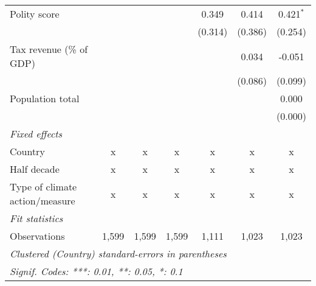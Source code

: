 \begin{tabular}{lcccccc}
   Polity score                                              &               &                &                & 0.349          & 0.414          & 0.421$^{*}$\\   
                                                             &               &                &                & (0.314)        & (0.386)        & (0.254)\\   
   Tax revenue (\% of GDP)                                   &               &                &                &                & 0.034          & -0.051\\   
                                                             &               &                &                &                & (0.086)        & (0.099)\\   
   Population total                                          &               &                &                &                &                & 0.000\\   
                                                             &               &                &                &                &                & (0.000)\\   
   \emph{Fixed effects}\\
   Country                                                   & x             & x              & x              & x              & x              & x\\  
   Half decade                                               & x             & x              & x              & x              & x              & x\\  
   Type of climate action/measure                            & x             & x              & x              & x              & x              & x\\  
   \midrule \emph{Fit statistics}\\
   Observations                                              & 1,599         & 1,599          & 1,599          & 1,111          & 1,023          & 1,023\\  
   \midrule
   \multicolumn{7}{l}{\emph{Clustered (Country) standard-errors in parentheses}}\\
   \multicolumn{7}{l}{\emph{Signif. Codes: ***: 0.01, **: 0.05, *: 0.1}}\\
\end{tabular}
\par\endgroup


